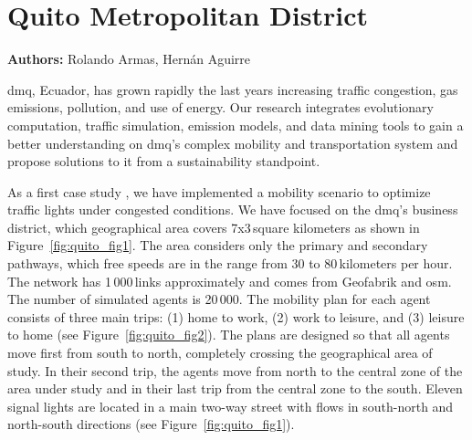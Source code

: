 \section{Quito Metropolitan District}
\label{sec:quito}
\hfill \textbf{Authors:} Rolando Armas, Hernán Aguirre

\gls{dmq}, Ecuador, has grown rapidly the last years increasing traffic congestion, gas emissions, pollution, and use of energy. Our research integrates evolutionary computation, traffic simulation, emission models, and data mining tools to gain a better understanding on \gls{dmq}’s complex mobility and transportation system and propose solutions to it from a sustainability standpoint.

As a first case study \citep[][]{ArmasEtAl_SEAL_2014}, we have implemented a mobility scenario to optimize traffic lights under congested conditions. We have focused on the
\gls{dmq}’s business district, which geographical area covers 7x3\,square kilometers as shown in Figure~\ref{fig:quito_fig1}. The area considers only the primary and secondary pathways, which free speeds are in the range from 30 to 80\,kilometers per hour. The network has 1\,000\,links approximately and comes from Geofabrik and \gls{osm}. The number of simulated agents is 20\,000. The mobility plan for each agent consists of three main trips: (1) home to work, (2) work to leisure, and (3) leisure to home (see Figure~\ref{fig:quito_fig2}). The plans are designed so that all agents move first from south to north, completely crossing the geographical area of study. In their second trip, the agents move from north to the central zone of the area under study and in their last trip from the central zone to the south. Eleven signal lights are located in a main two-way street with flows in south-north and north-south directions (see Figure~\ref{fig:quito_fig1}).

